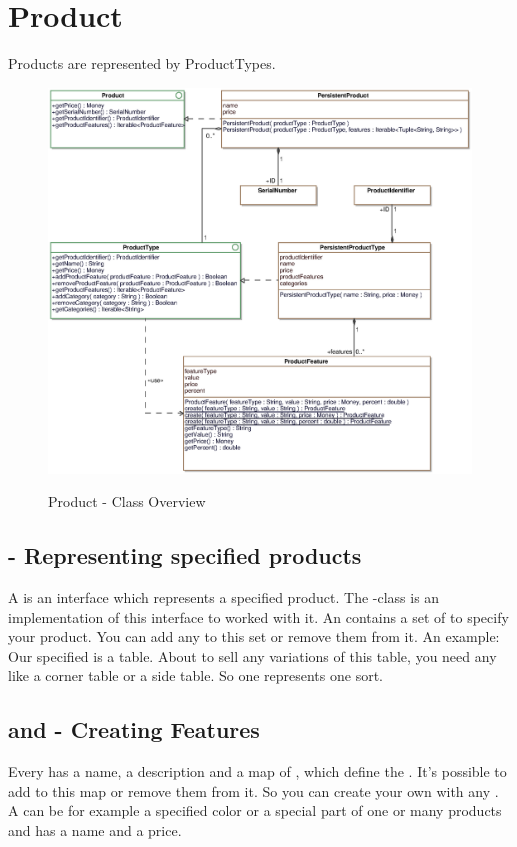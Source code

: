 \section{Product}

Products are represented by ProductTypes.

\begin{figure}[ht]
	\centering
  \includegraphics[width=1.0\textwidth]{images/Product_Overview.eps}
	\label{product_overview}
	\caption{Product - Class Overview}
\end{figure}

\subsection{ - Representing specified products}
A  is an interface which represents a specified product. The -class is an implementation of this interface to worked with it.
An  contains a set of  to specify your product. You can add any   to this set or remove them from it.
An example: Our specified  is a table. About to sell any variations of this table, you need any  like a corner table or a side table. 
So one  represents one sort.

\subsection{ and  - Creating Features}
Every  has a name, a description and a map of , which define the . It's possible to add 
 to this map or remove them from it. So you can create your own  with any .\\
A  can be for example a specified color or a special part of one or many products and has a name and a price.   

